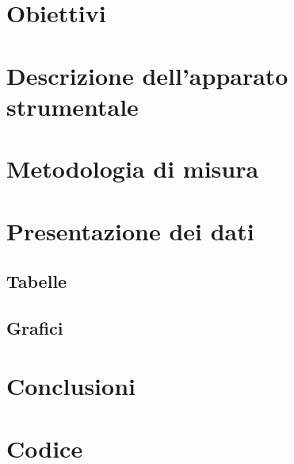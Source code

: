 \documentclass[12pt,a4paper]{article} %
\begin{document}
\maketitle %

\section{Obiettivi}
	

\section{Descrizione dell'apparato strumentale}
	

\section{Metodologia di misura}
	
	\clearpage
	
\section{Presentazione dei dati}			
	\subsection{Tabelle}
	
	
	\clearpage
	\subsection{Grafici}
	
		
\section{Conclusioni}
	
	
\section{Codice}
	
	
\end{document}
